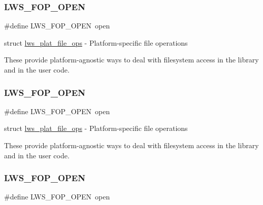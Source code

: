 \subsubsection{\texorpdfstring{L\+W\+S\+\_\+\+F\+O\+P\+\_\+\+O\+P\+EN}{LWS\_FOP\_OPEN}\hspace{0.1cm}{\footnotesize\ttfamily [2/6]}}
{\footnotesize\ttfamily \#define L\+W\+S\+\_\+\+F\+O\+P\+\_\+\+O\+P\+EN~open}

struct \hyperlink{structlws__plat__file__ops}{lws\+\_\+plat\+\_\+file\+\_\+ops} -\/ Platform-\/specific file operations

These provide platform-\/agnostic ways to deal with filesystem access in the library and in the user code. \mbox{\label{group__fops_ga7972d4b546c7af37bb76d4c60f2ad553}} 
\subsubsection{\texorpdfstring{L\+W\+S\+\_\+\+F\+O\+P\+\_\+\+O\+P\+EN}{LWS\_FOP\_OPEN}\hspace{0.1cm}{\footnotesize\ttfamily [3/6]}}
{\footnotesize\ttfamily \#define L\+W\+S\+\_\+\+F\+O\+P\+\_\+\+O\+P\+EN~open}

struct \hyperlink{structlws__plat__file__ops}{lws\+\_\+plat\+\_\+file\+\_\+ops} -\/ Platform-\/specific file operations

These provide platform-\/agnostic ways to deal with filesystem access in the library and in the user code. \mbox{\label{group__fops_ga7972d4b546c7af37bb76d4c60f2ad553}} 
\subsubsection{\texorpdfstring{L\+W\+S\+\_\+\+F\+O\+P\+\_\+\+O\+P\+EN}{LWS\_FOP\_OPEN}\hspace{0.1cm}{\footnotesize\ttfamily [4/6]}}
{\footnotesize\ttfamily \#define L\+W\+S\+\_\+\+F\+O\+P\+\_\+\+O\+P\+EN~open}

